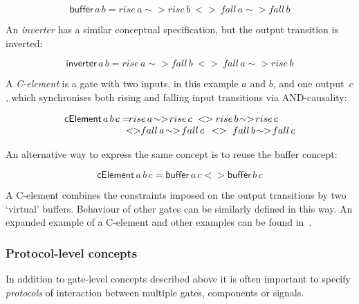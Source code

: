 \documentclass[british,conference,compsoc]{IEEEtran}
\begin{document}
\[
\mathsf{buffer}\,a\,b=rise\,a \sim> rise\,b\ <>\
fall\,a\sim> fall\,b
\]

\vspace{-1mm}

\noindent An \emph{inverter} has a similar conceptual specification, but the
output transition is inverted:

\vspace{-4mm}

\[
\mathsf{inverter}\,a\,b=rise\,a\sim> fall\,b\ <>\
fall\,a\sim> rise\,b
\]

\vspace{-1mm}

\noindent A \emph{C-element} is a gate with two inputs, in this example $a$ and $b$, and one
output~$c$, which synchronises both rising and falling input transitions
via AND-causality:

\vspace{-3mm}

\[
\begin{array}{lcl}
\mathsf{cElement}\,a\, b\, c=&\hspace{-9mm}rise\,a\!\sim>\! 
	rise\,c\ <> rise\,b\!\sim>\! rise\,c\ \\
&\hspace{-5mm}<>\hspace{-1mm} fall\,a\!\sim>\! fall\,c\ \,
	<>\ fall\,b\!\sim>\! fall\,c
\end{array}
\]

\vspace{-1mm}

An alternative way to express the same concept is to reuse the buffer concept:

\vspace{-3mm}

\[
\mathsf{cElement}\,a\, b\, c=\mathsf{buffer}\,a\, c <> \mathsf{buffer}\,b\, c
\]

\vspace{-1mm}

A C-element combines the constraints imposed on the output
transitions by two `virtual' buffers. Behaviour of other gates can be similarly
defined in this way. An expanded example of a C-element and other examples can 
be found in~\cite{2015_Beaumont_MEMOCODE}.

\vspace{-2mm}

\subsubsection{Protocol-level concepts} In addition to gate-level concepts
described above it is often important to specify \emph{protocols}
of interaction between multiple gates, components or signals. 
\end{document}
